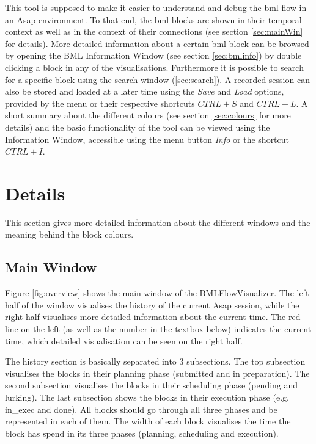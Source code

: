 \documentclass[12pt,a4paper]{article}
\begin{document}
This tool is supposed to make it easier to understand and debug the bml flow in an Asap environment. To that end, the bml blocks are shown in their temporal context as well
as in the context of their connections (see section \ref{sec:mainWin} for details). More detailed information about a certain bml block can be browsed by opening
the BML Information Window (see section \ref{sec:bmlinfo}) by double clicking a block in any of the visualisations. Furthermore it is possible to search for a specific
block using the search window (\ref{sec:search}). A recorded session can also be stored and loaded at a later time using the \textit{Save} and \textit{Load} options, 
provided by the menu or their respective shortcuts $CTRL+S$ and $CTRL+L$. A short summary about the different colours (see section \ref{sec:colours} for more details) 
and the basic functionality of the tool can be viewed using the Information Window, accessible using the menu button \textit{Info} or the shortcut $CTRL+I$.

\section{Details}

This section gives more detailed information about the different windows and the meaning behind the block colours.

\subsection{Main Window \label{sec:mainWin}}
Figure \ref{fig:overview} shows the main window of the BMLFlowVisualizer. The left half of the window visualises the history of the current Asap session, while the right
half visualises more detailed information about the current time. The red line on the left (as well as the number in the textbox below) 
indicates the current time, which detailed visualisation can be seen on the right half. 

The history section is basically separated into 3 subsections. The top subsection visualises the blocks in their planning phase (submitted and in preparation).
The second subsection visualises the blocks in their scheduling phase (pending and lurking). The last subsection shows the blocks in their execution phase 
(e.g. in\_exec and done). All blocks should go through all three phases and be represented in each of them. The width of each block visualises the time 
the block has spend in its three phases (planning, scheduling and execution). 
\end{document}
